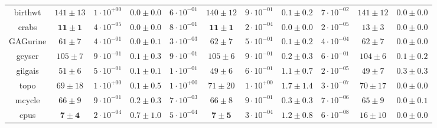 \begin{table*}[!tp]
\begin{center}
\begin{tiny}
\begin{sc}
{\begin{tabular}{ccccccccccc}
                    birthwt & $141 \pm 13$ & $1 \cdot 10^{+00}$ & $0.0 \pm 0.0$
                    & $6 \cdot 10^{-01}$ & $140 \pm 12$ & $9 \cdot 10^{-01}$ &
                    $0.1 \pm 0.2$ & $7 \cdot 10^{-02}$ & $141 \pm 12$ & $0.0
                    \pm 0.0$ \\
                    crabs & $\mathbf{11 \pm 1}$ & $4 \cdot 10^{-05}$ & $0.0 \pm
                    0.0$ & $8 \cdot 10^{-01}$ & $\mathbf{11 \pm 1}$ & $2 \cdot
                    10^{-04}$ & $\mathbf{0.0 \pm 0.0}$ & $2 \cdot 10^{-05}$ &
                    $13 \pm 3$ & $0.0 \pm 0.0$ \\
                    GAGurine & $61 \pm 7$ & $4 \cdot 10^{-01}$ & $0.0 \pm 0.1$
                    & $3 \cdot 10^{-03}$ & $62 \pm 7$ & $5 \cdot 10^{-01}$ &
                    $\mathbf{0.1 \pm 0.2}$ & $4 \cdot 10^{-04}$ & $62 \pm 7$ &
                    $0.0 \pm 0.0$ \\
                    geyser & $105 \pm 7$ & $9 \cdot 10^{-01}$ & $0.1 \pm 0.3$ &
                    $9 \cdot 10^{-01}$ & $105 \pm 6$ & $9 \cdot 10^{-01}$ &
                    $0.2 \pm 0.3$ & $6 \cdot 10^{-01}$ & $104 \pm 6$ & $0.1 \pm
                    0.2$ \\
                    gilgais & $51 \pm 6$ & $5 \cdot 10^{-01}$ & $0.1 \pm 0.1$ &
                    $1 \cdot 10^{-01}$ & $49 \pm 6$ & $6 \cdot 10^{-01}$ &
                    $\mathbf{1.1 \pm 0.7}$ & $2 \cdot 10^{-05}$ & $49 \pm 7$ &
                    $0.3 \pm 0.3$ \\
                    topo & $69 \pm 18$ & $1 \cdot 10^{+00}$ & $0.1 \pm 0.5$ &
                    $1 \cdot 10^{+00}$ & $71 \pm 20$ & $1 \cdot 10^{+00}$ &
                    $\mathbf{1.7 \pm 1.4}$ & $3 \cdot 10^{-07}$ & $70 \pm 17$ &
                    $0.0 \pm 0.0$ \\
                    mcycle & $66 \pm 9$ & $9 \cdot 10^{-01}$ & $0.2 \pm 0.3$ &
                    $7 \cdot 10^{-03}$ & $66 \pm 8$ & $9 \cdot 10^{-01}$ &
                    $\mathbf{0.3 \pm 0.3}$ & $7 \cdot 10^{-06}$ & $65 \pm 9$ &
                    $0.0 \pm 0.1$ \\
                    cpus & $\mathbf{7 \pm 4}$ & $2 \cdot 10^{-04}$ &
                    $\mathbf{0.7 \pm 1.0}$ & $5 \cdot 10^{-04}$ & $\mathbf{7
                    \pm 5}$ & $3 \cdot 10^{-04}$ & $\mathbf{1.2 \pm 0.8}$ & $6
                    \cdot 10^{-08}$ & $16 \pm 10$ & $0.0 \pm 0.0$ \\
                    \bottomrule
                \end{tabular}}
            \end{sc}
        \end{tiny}
    \end{center}
    \addtolength{\tabcolsep}{3pt}
    \renewcommand{\arraystretch}{1.0}%
\end{table*}
